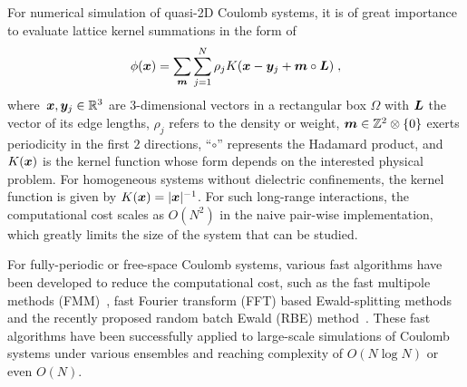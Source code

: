 
For numerical simulation of quasi-2D Coulomb systems, it is of great importance to evaluate lattice kernel summations in the form of
\begin{equation}\label{eq::phi12}
	\phi(\boldsymbol{x}) = \sum_{\boldsymbol{m}} \sum_{j = 1}^{N} \rho_j K(\boldsymbol{x} - \boldsymbol{y}_j + \boldsymbol{m} \circ \boldsymbol{L})\;,
\end{equation}
where~$\boldsymbol{x}, \boldsymbol{y}_j \in \mathbb{R}^3$ are $3$-dimensional vectors in a rectangular box $\Omega$ with $\boldsymbol{L}$ the vector of its edge lengths, $\rho_j$ refers to the density or weight, $\boldsymbol{m} \in \mathbb{Z}^2 \otimes \{0\}$ exerts periodicity in the first $2$ directions, ``$\circ$'' represents the Hadamard product, and~$K(\boldsymbol{x})$ is the kernel function whose form depends on the interested physical problem. 
For homogeneous systems without dielectric confinements, the kernel function is given by $K(\boldsymbol{x}) = \lvert\boldsymbol{x}\rvert^{-1}$.
For such long-range interactions, the computational cost scales as $O(N^2)$ in the naive pair-wise implementation, which greatly limits the size of the system that can be studied.


For fully-periodic or free-space Coulomb systems, various fast algorithms have been developed to reduce the computational cost, such as the fast multipole methods (FMM)~\cite{greengard1987fast,cheng1999fast,ying2004kernel}, fast Fourier transform (FFT) based Ewald-splitting methods~\cite{hockney2021computer,darden1993particle,essmann1995smooth} and the recently proposed random batch Ewald (RBE) method~\cite{jin2021random, liang2022superscalability,liang2024JCP}.
These fast algorithms have been successfully applied to large-scale simulations of Coulomb systems under various ensembles and reaching complexity of $O(N\log N)$ or even $O(N)$.
 
